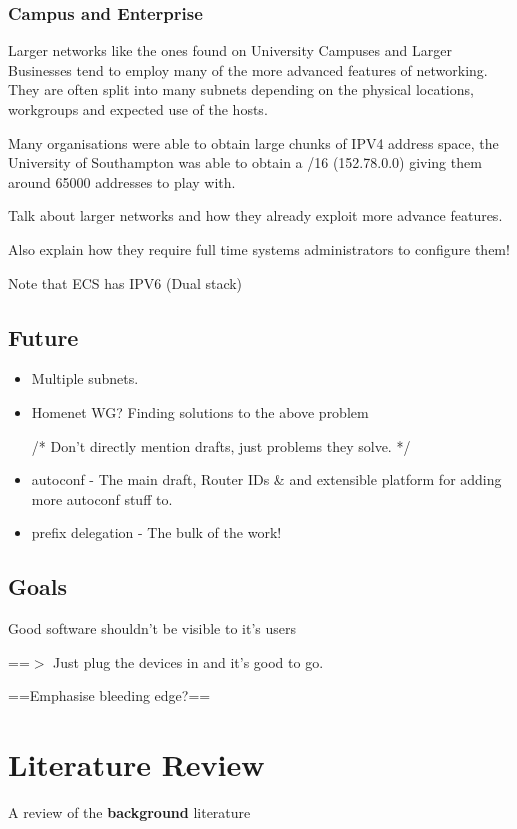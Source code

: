 \documentclass[12pt]{report}
\begin{document}
\subsection{Campus and Enterprise}
Larger networks like the ones found on University Campuses and Larger
Businesses tend to employ many of the more advanced features of networking.
They are often split into many subnets depending on the physical locations,
workgroups and expected use of the hosts. 

Many organisations were able to obtain large chunks of IPV4 address space, the
University of Southampton was able to obtain a /16 (152.78.0.0) giving them
around 65000 addresses to play with.

Talk about larger networks and how they already exploit more advance features.

Also explain how they require full time systems administrators to configure them!

Note that ECS has IPV6 (Dual stack)

\section{Future}
\begin{itemize}
\item Multiple subnets. 
\item Homenet WG? Finding solutions to the above problem

/* Don't directly mention drafts, just problems they solve. */

\item autoconf - The main draft, Router IDs \& and extensible platform for adding more autoconf stuff to.
\item prefix delegation - The bulk of the work!
\end{itemize}

\section{Goals}
Good software shouldn't be visible to it's users

==$>$ Just plug the devices in and it's good to go. 

==Emphasise bleeding edge?==

\chapter{Literature Review} 
A review of the \textbf{background} literature
\end{document}
